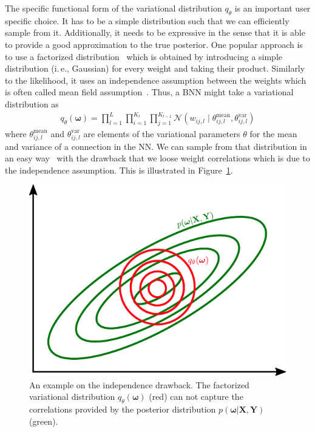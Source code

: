 \documentclass[runningheads]{llncs}
\begin{document}
The specific functional form of the variational distribution $q_\theta$ is an important user specific choice.
It has to be a simple distribution such that we can efficiently sample from it.
Additionally, it needs to be expressive in the sense that it is able to provide a good approximation to the true posterior.
One popular approach is to use a factorized distribution~\cite{BlundellBBB,Graves2011Practical,hernandez2015probabilistic} which is obtained by introducing a simple distribution (i.\,e., Gaussian) for every weight and taking their product.
Similarly to the likelihood, it uses an independence assumption between the weights which is often called mean field assumption~\cite{blei2017variational}.
Thus, a BNN might take a variational distribution as 
\begin{align}
    q_\theta\left(\boldsymbol{\omega}\right) = \prod_{l=1}^{L}\prod_{i=1}^{K_l}\prod_{j=1}^{K_{l-1}} \mathcal{N}\left( w_{ij,l} \mid \theta^\mathrm{mean}_{ij,l}, \theta^\mathrm{var}_{ij,l}\right)\label{eq:variational_factorized}
\end{align}
where $\theta^\mathrm{mean}_{ij,l}$ and $\theta^\mathrm{var}_{ij,l}$ are elements of the variational parameters $\theta$ for the mean and variance of a connection in the NN. 
We can sample from that distribution in an easy way~\cite{bishop:2006:PRML} with the drawback that we loose weight correlations which is due to the independence assumption. This is illustrated in Figure~\ref{fig:correlation_loss}.
\begin{figure}
    \centering
    \includegraphics[width=.6\textwidth]{images/loosing_correlations.pdf}
    \caption{An example on the independence drawback. The factorized variational distribution $q_\theta(\boldsymbol{\omega})$ (red) can not capture the correlations provided by the posterior distribution $p(\boldsymbol{\omega} | \mathbf{X}, \mathbf{Y})$ (green).}
    \label{fig:correlation_loss}
\end{figure}
\end{document}

